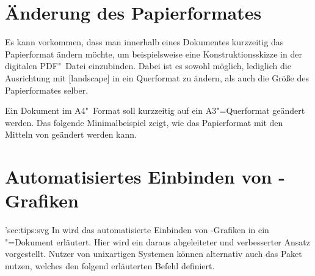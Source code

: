 \section{Änderung des Papierformates}
Es kann vorkommen, dass man innerhalb eines Dokumentes kurzzeitig das 
Papierformat ändern möchte, um beispielsweise eine Konstruktionsskizze in der 
digitalen PDF"~Datei einzubinden. Dabei ist es sowohl möglich, lediglich die 
Ausrichtung mit [landscape] in ein Querformat zu ändern, als 
auch die Größe des Papierformates selber.
%
\begin{Example}
Ein Dokument im A4"~Format soll kurzzeitig auf ein A3"=Querformat geändert 
werden. Das folgende Minimalbeispiel zeigt, wie das Papierformat mit den 
Mitteln von \KOMAScript{} geändert werden kann.
\end{Example}



\section{Automatisiertes Einbinden von -Grafiken }
\manualhyperdef'{sec:tips:svg}%
%
%
In  wird das 
automatisierte Einbinden von -Grafiken in ein 
"=Dokument erläutert. Hier wird ein daraus abgeleiteter und 
verbesserter Ansatz vorgestellt. Nutzer von unixartigen Systemen können 
alternativ auch das Paket  nutzen, welches den folgend erläuterten 
Befehl  definiert.

